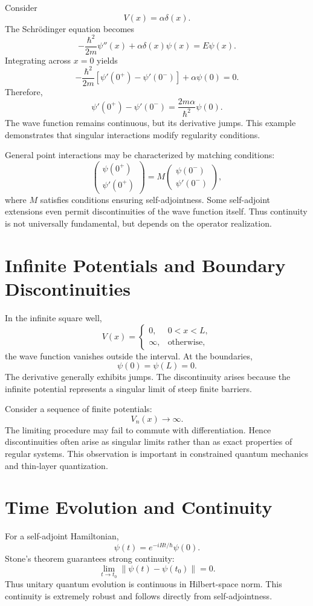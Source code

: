 \documentclass[11pt]{article}
\begin{document}
Consider
\[
V(x)=\alpha \delta(x).
\]
The Schrödinger equation becomes
\[
-\frac{\hbar^2}{2m}\psi''(x)+\alpha\delta(x)\psi(x)=E\psi(x).
\]
Integrating across \(x=0\) yields
\[
-\frac{\hbar^2}{2m}
\left[
\psi'(0^+)-\psi'(0^-)
\right]
+
\alpha\psi(0)=0.
\]
Therefore,
\[
\psi'(0^+)-\psi'(0^-)
=
\frac{2m\alpha}{\hbar^2}\psi(0).
\]
The wave function remains continuous, but its derivative jumps.
This example demonstrates that singular interactions modify regularity conditions.

General point interactions may be characterized by matching conditions:
\[
\begin{pmatrix}
\psi(0^+)\\
\psi'(0^+)
\end{pmatrix}
=
M
\begin{pmatrix}
\psi(0^-)\\
\psi'(0^-)
\end{pmatrix},
\]
where \(M\) satisfies conditions ensuring self-adjointness.
Some self-adjoint extensions even permit discontinuities of 
the wave function itself.
Thus continuity is not universally fundamental, but depends on 
the operator realization.

\section{ Infinite Potentials and Boundary Discontinuities}
In the infinite square well,
\[
V(x)=
\begin{cases}
0,&0<x<L,\\
\infty,&\text{otherwise},
\end{cases}
\]
the wave function vanishes outside the interval.
At the boundaries,
\[
\psi(0)=\psi(L)=0.
\]
The derivative generally exhibits jumps.
The discontinuity arises because the infinite potential represents a 
singular limit of steep finite barriers.

Consider a sequence of finite potentials:
\[
V_n(x)\to\infty.
\]
The limiting procedure may fail to commute with differentiation.
Hence discontinuities often arise as singular limits rather than as 
exact properties of regular systems.
This observation is important in constrained quantum mechanics 
and thin-layer quantization.

\section{Time Evolution and Continuity}

For a self-adjoint Hamiltonian,
\[
\psi(t)=e^{-iHt/\hbar}\psi(0).
\]
Stone’s theorem guarantees strong continuity:
\[
\lim_{t\to t_0}
\|\psi(t)-\psi(t_0)\|=0.
\]
Thus unitary quantum evolution is continuous in Hilbert-space norm.
This continuity is extremely robust and follows directly from self-adjointness.
\end{document}
